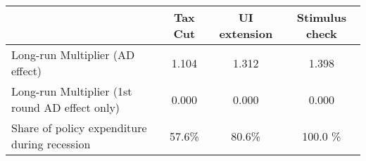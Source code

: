 \begin{tabular}{@{}lccc@{}}
\toprule
& Tax Cut    & UI extension    & Stimulus check    \\  \midrule
Long-run Multiplier (AD effect) &1.104  & 1.312  & 1.398     \\
Long-run Multiplier (1st round AD effect only) &0.000  & 0.000  & 0.000     \\
Share of policy expenditure during recession &57.6\%  & 80.6\%  & 100.0 \%    \\
\end{tabular}
